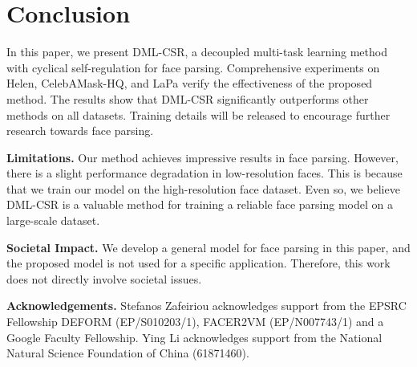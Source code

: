 \documentclass[10pt,twocolumn,letterpaper]{article}
\begin{document}
\section{Conclusion}

In this paper, we present DML-CSR, a decoupled multi-task learning method with cyclical self-regulation for face parsing. Comprehensive experiments on Helen, CelebAMask-HQ, and LaPa verify the effectiveness of the proposed method. The results show that DML-CSR significantly outperforms other methods on all datasets. Training details will be released to encourage further research towards face parsing.

\noindent\textbf{Limitations.} Our method achieves impressive results in face parsing. However, there is a slight performance degradation in low-resolution faces. This is because that we train our model on the high-resolution face dataset. Even so, we believe DML-CSR is a valuable method for training a reliable face parsing model on a large-scale dataset.

\noindent\textbf{Societal Impact.} We develop a general model for face parsing in this paper, and the proposed model is not used for a specific application. Therefore, this work does not directly involve societal issues.

\noindent\textbf{Acknowledgements.} Stefanos Zafeiriou acknowledges support from the EPSRC Fellowship DEFORM (EP/S010203/1), FACER2VM (EP/N007743/1) and a Google Faculty Fellowship. 
Ying Li acknowledges support from the National Natural Science Foundation of China (61871460).

{\small


}
\end{document}
